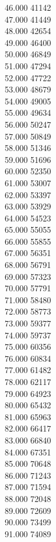 { 46.000	41142 \\
 47.000	41449 \\
 48.000	42654 \\
 49.000	46400 \\
 50.000	46849 \\
 51.000	47294 \\
 52.000	47722 \\
 53.000	48679 \\
 54.000	49005 \\
 55.000	49634 \\
 56.000	50247 \\
 57.000	50849 \\
 58.000	51346 \\
 59.000	51696 \\
 60.000	52350 \\
 61.000	53007 \\
 62.000	53397 \\
 63.000	53929 \\
 64.000	54523 \\
 65.000	55055 \\
 66.000	55855 \\
 67.000	56351 \\
 68.000	56791 \\
 69.000	57323 \\
 70.000	57791 \\
 71.000	58480 \\
 72.000	58773 \\
 73.000	59377 \\
 74.000	59737 \\
 75.000	60356 \\
 76.000	60834 \\
 77.000	61482 \\
 78.000	62117 \\
 79.000	64923 \\
 80.000	65432 \\
 81.000	65963 \\
 82.000	66417 \\
 83.000	66840 \\
 84.000	67351 \\
 85.000	70648 \\
 86.000	71243 \\
 87.000	71594 \\
 88.000	72048 \\
 89.000	72609 \\
 90.000	73499 \\
 91.000	74089 \\
}
